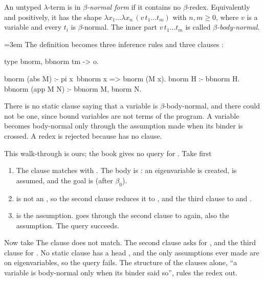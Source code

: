 {{\begin{definition}\label{def:lambdatree-bnorm}
An untyped $\lambda$-term is in \emph{$\beta$-normal form} if it contains no $\beta$-redex. Equivalently and
positively, it has the shape $\lambda x_1\ldots\lambda x_n\,(v\,t_1\ldots t_m)$ with $n,m\ge0$, where $v$ is a
variable and every $t_i$ is $\beta$-normal. The inner part $v\,t_1\ldots t_m$ is called
\emph{$\beta$-body-normal}.
\end{definition}

{\emergencystretch=3em
The definition becomes three inference rules and three clauses :
}
\begin{lprolog}
type bnorm, bbnorm  tm -> o.

bnorm (abs M)    :- pi x\ bbnorm x => bnorm (M x).
bnorm H          :- bbnorm H.
bbnorm (app M N) :- bbnorm M, bnorm N.
\end{lprolog}
There is no static clause saying that a variable is $\beta$-body-normal, and there could not be one, since
bound variables are not terms of the program. A variable becomes body-normal only through the assumption
 made when its binder is crossed. A redex  is rejected because
 has no clause.

\begin{tutorial}
This walk-through is ours; the book gives no query for . Take first
\begin{enumerate}[nosep]
  \item The  clause matches with . The body is
        : an eigenvariable  is created,  is assumed, and the
        goal is  (after $\beta_0$).
  \item {} is not an , so the second clause reduces it to , and the
        third clause to  and .
  \item {} is the assumption.  goes through the second clause to  again, also
        the assumption. The query succeeds.
\end{enumerate}
Now take  The  clause does not match. The second clause asks for
, and the third clause for . No static clause has a
head , and the only assumptions ever made are  on eigenvariables, so the query
fails. The structure of the clauses alone, \enquote{a variable is body-normal only when its binder said so},
rules the redex out.
\end{tutorial}

}}
